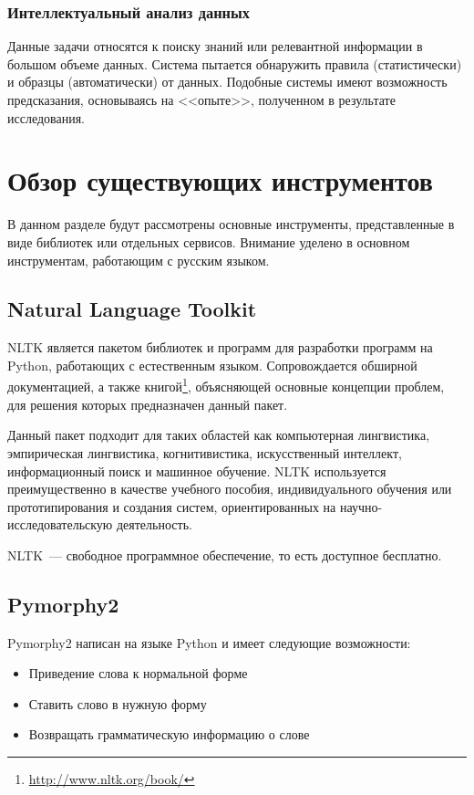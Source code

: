 \documentclass[14pt]{matmex-diploma-custom}
\begin{document}
\subsubsection{Интеллектуальный анализ данных}

Данные задачи относятся к поиску знаний или релевантной информации в большом объеме данных. Система пытается обнаружить правила (статистически) и образцы (автоматически) от данных. Подобные системы имеют возможность предсказания, основываясь на <<опыте>>, полученном в результате исследования.

\clearpage\section{Обзор существующих инструментов}

\label{sec:overview}

В данном разделе будут рассмотрены основные инструменты, представленные в виде библиотек или отдельных сервисов. Внимание уделено в основном инструментам, работающим с русским языком.

\subsection{Natural Language Toolkit}

NLTK\cite{tools:nltk} является пакетом библиотек и программ для разработки программ на Python, работающих с естественным языком. Сопровождается обширной документацией, а также книгой\footnote{\url{http://www.nltk.org/book/}}, объясняющей основные концепции проблем, для решения которых предназначен данный пакет.

Данный пакет подходит для таких областей как компьютерная лингвистика, эмпирическая лингвистика, когнитивистика, искусственный интеллект, информационный поиск и машинное обучение. NLTK используется преимущественно в качестве учебного пособия, индивидуального обучения или прототипирования и создания систем, ориентированных на научно-исследовательскую деятельность.

NLTK~--- свободное программное обеспечение, то есть доступное бесплатно.

\subsection{Pymorphy2}

Pymorphy2\cite{tools:pymorphy2} написан на языке Python и имеет следующие возможности:

\begin{itemize}

\item Приведение слова к нормальной форме

\item Ставить слово в нужную форму

\item Возвращать грамматическую информацию о слове

\end{itemize}
\end{document}
